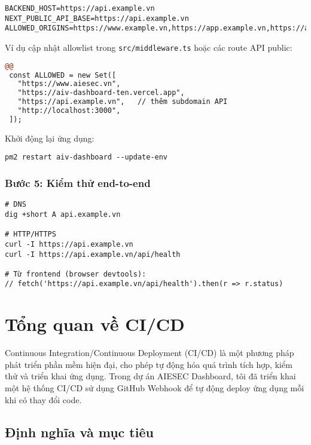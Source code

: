 \documentclass[12pt,a4paper]{article}
\begin{document}
\begin{lstlisting}[caption=Cập nhật .env trên server]
BACKEND_HOST=https://api.example.vn
NEXT_PUBLIC_API_BASE=https://api.example.vn
ALLOWED_ORIGINS=https://www.example.vn,https://app.example.vn,https://api.example.vn,http://localhost:3000
\end{lstlisting}

Ví dụ cập nhật allowlist trong \texttt{src/middleware.ts} hoặc các route API public:

\begin{lstlisting}[language=diff,caption=Bổ sung origin mới]
@@
 const ALLOWED = new Set([
   "https://www.aiesec.vn",
   "https://aiv-dashboard-ten.vercel.app",
   "https://api.example.vn",   // thêm subdomain API
   "http://localhost:3000",
 ]);
\end{lstlisting}

Khởi động lại ứng dụng:

\begin{lstlisting}
pm2 restart aiv-dashboard --update-env
\end{lstlisting}

\subsubsection{Bước 5: Kiểm thử end-to-end}

\begin{lstlisting}[caption=Kiểm thử]
# DNS
dig +short A api.example.vn

# HTTP/HTTPS
curl -I https://api.example.vn
curl -I https://api.example.vn/api/health

# Từ frontend (browser devtools):
// fetch('https://api.example.vn/api/health').then(r => r.status)
\end{lstlisting}

\section{Tổng quan về CI/CD}

Continuous Integration/Continuous Deployment (CI/CD) là một phương pháp phát triển phần mềm hiện đại, cho phép tự động hóa quá trình tích hợp, kiểm thử và triển khai ứng dụng. Trong dự án AIESEC Dashboard, tôi đã triển khai một hệ thống CI/CD sử dụng GitHub Webhook để tự động deploy ứng dụng mỗi khi có thay đổi code.

\subsection{Định nghĩa và mục tiêu}
\end{document}
